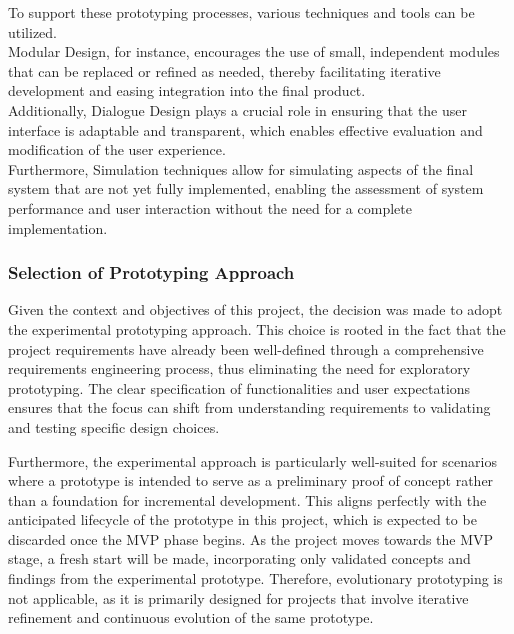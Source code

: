 To support these prototyping processes, various techniques and tools can be utilized.
\autocite[cf.][p.12]{floydSystematicLookPrototyping1984} \\Modular Design, for instance, encourages the use of small,
independent modules that can be replaced or refined as needed, thereby facilitating iterative development and easing
integration into the final product.\autocite[cf.][p.12]{floydSystematicLookPrototyping1984} \\Additionally, Dialogue
Design plays a crucial role in ensuring that the user interface is adaptable and transparent, which enables effective
evaluation and modification of the user experience.\autocite[cf.][p.12]{floydSystematicLookPrototyping1984}
\\Furthermore, Simulation techniques allow for simulating aspects of the final system that are not yet fully
implemented, enabling the assessment of system performance and user interaction without the need for a complete
implementation.\autocite[cf.][p.13]{floydSystematicLookPrototyping1984}

\subsubsection{Selection of Prototyping Approach}\label{subsubsec:ptselection}

Given the context and objectives of this project, the decision was made to adopt the experimental prototyping approach.
This choice is rooted in the fact that the project requirements have already been well-defined through a comprehensive
requirements engineering process, thus eliminating the need for exploratory prototyping. The clear specification of
functionalities and user expectations ensures that the focus can shift from understanding requirements to validating and
testing specific design choices.

Furthermore, the experimental approach is particularly well-suited for scenarios where a prototype is intended to serve
as a preliminary proof of concept rather than a foundation for incremental development. This aligns perfectly with the
anticipated lifecycle of the prototype in this project, which is expected to be discarded once the \ac{MVP} phase
begins. As the project moves towards the MVP stage, a fresh start will be made, incorporating only validated concepts
and findings from the experimental prototype. Therefore, evolutionary prototyping is not applicable, as it is primarily
designed for projects that involve iterative refinement and continuous evolution of the same prototype.

